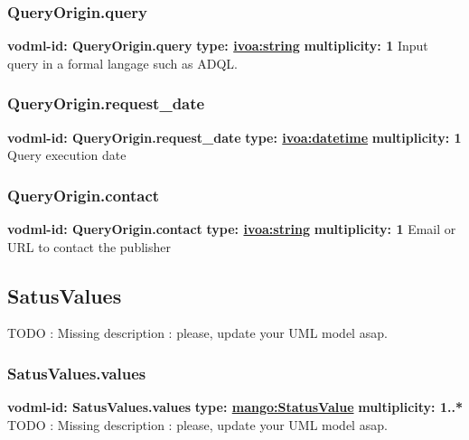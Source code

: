     \subsubsection{QueryOrigin.query}
      \textbf{vodml-id: QueryOrigin.query} \newline
      \textbf{type: \hyperref[sect:ivoa]{ivoa:string}} \newline
      \textbf{multiplicity: 1} \newline
      Input query in a formal langage such as ADQL.

    \subsubsection{QueryOrigin.request\_date}
      \textbf{vodml-id: QueryOrigin.request\_date} \newline
      \textbf{type: \hyperref[sect:ivoa]{ivoa:datetime}} \newline
      \textbf{multiplicity: 1} \newline
      Query execution date

    \subsubsection{QueryOrigin.contact}
      \textbf{vodml-id: QueryOrigin.contact} \newline
      \textbf{type: \hyperref[sect:ivoa]{ivoa:string}} \newline
      \textbf{multiplicity: 1} \newline
      Email or URL to contact the publisher

  \subsection{SatusValues}
  \label{sect:SatusValues}
    TODO : Missing description : please, update your UML model asap.

    \subsubsection{SatusValues.values}
      \textbf{vodml-id: SatusValues.values} \newline
      \textbf{type: \hyperref[sect:StatusValue]{mango:StatusValue}} \newline
      \textbf{multiplicity: 1..*} \newline
      TODO : Missing description : please, update your UML model asap.

